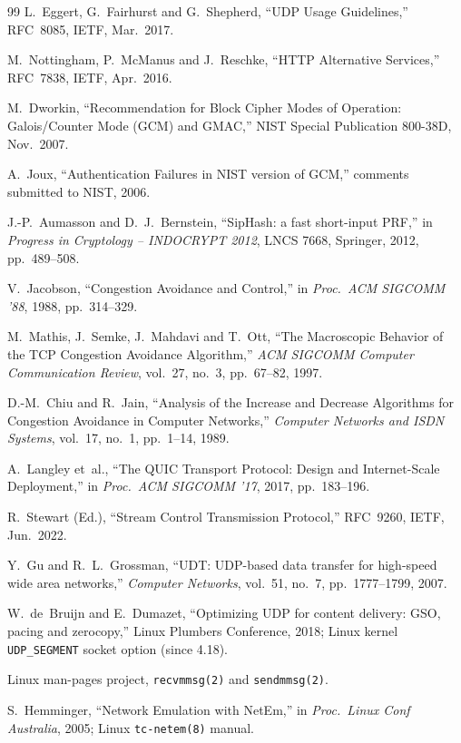 \begin{thebibliography}{99}
 L.~Eggert, G.~Fairhurst and G.~Shepherd, ``UDP Usage Guidelines,'' RFC~8085, IETF, Mar.\ 2017.

 M.~Nottingham, P.~McManus and J.~Reschke, ``HTTP Alternative Services,'' RFC~7838, IETF, Apr.\ 2016.

 M.~Dworkin, ``Recommendation for Block Cipher Modes of Operation: Galois/Counter Mode (GCM) and GMAC,'' NIST Special Publication 800-38D, Nov.\ 2007.

 A.~Joux, ``Authentication Failures in NIST version of GCM,'' comments submitted to NIST, 2006.

 J.-P.~Aumasson and D.~J.~Bernstein, ``SipHash: a fast short-input PRF,'' in \emph{Progress in Cryptology -- INDOCRYPT 2012}, LNCS 7668, Springer, 2012, pp.~489--508.

 V.~Jacobson, ``Congestion Avoidance and Control,'' in \emph{Proc.\ ACM SIGCOMM '88}, 1988, pp.~314--329.

 M.~Mathis, J.~Semke, J.~Mahdavi and T.~Ott, ``The Macroscopic Behavior of the TCP Congestion Avoidance Algorithm,'' \emph{ACM SIGCOMM Computer Communication Review}, vol.~27, no.~3, pp.~67--82, 1997.

 D.-M.~Chiu and R.~Jain, ``Analysis of the Increase and Decrease Algorithms for Congestion Avoidance in Computer Networks,'' \emph{Computer Networks and ISDN Systems}, vol.~17, no.~1, pp.~1--14, 1989.

 A.~Langley et~al., ``The QUIC Transport Protocol: Design and Internet-Scale Deployment,'' in \emph{Proc.\ ACM SIGCOMM '17}, 2017, pp.~183--196.

 R.~Stewart (Ed.), ``Stream Control Transmission Protocol,'' RFC~9260, IETF, Jun.\ 2022.

 Y.~Gu and R.~L.~Grossman, ``UDT: UDP-based data transfer for high-speed wide area networks,'' \emph{Computer Networks}, vol.~51, no.~7, pp.~1777--1799, 2007.

 W.~de~Bruijn and E.~Dumazet, ``Optimizing UDP for content delivery: GSO, pacing and zerocopy,'' Linux Plumbers Conference, 2018; Linux kernel \texttt{UDP\_SEGMENT} socket option (since 4.18).

 Linux man-pages project, \texttt{recvmmsg(2)} and \texttt{sendmmsg(2)}.

 S.~Hemminger, ``Network Emulation with NetEm,'' in \emph{Proc.\ Linux Conf Australia}, 2005; Linux \texttt{tc-netem(8)} manual.


\end{thebibliography}
